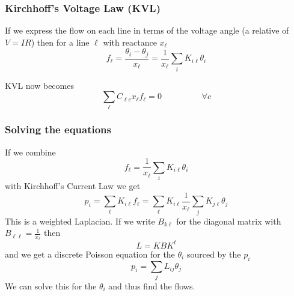 \documentclass[10pt,dvipsnames]{beamer}
\begin{document}
\begin{frame}
  \frametitle{Kirchhoff's Voltage Law (KVL)}

  If we express the flow on each line in terms of the voltage angle (a
  relative of $V = IR$) then for a line $\ell$ with reactance $x_\ell$
  \begin{equation*}
    f_\ell = \frac{\theta_i - \theta_j}{x_\ell} = \frac{1}{x_\ell}\sum_{i} K_{i\ell} \theta_i
  \end{equation*}

  KVL now becomes
  \begin{equation*}
    \sum_\ell C_{\ell c} x_\ell f_\ell = 0 \hspace{2cm} \forall c
  \end{equation*}

\end{frame}



\begin{frame}
  \frametitle{Solving the equations}

  If we combine
    \begin{equation*}
    f_\ell  = \frac{1}{x_\ell}\sum_{i} K_{i\ell} \theta_i
  \end{equation*}
    with Kirchhoff's Current Law we get
    \begin{equation*}
    p_i = \sum_{\ell} K_{i\ell}f_\ell =   \sum_{\ell} K_{i\ell} \frac{1}{x_\ell}\sum_{j} K_{j\ell} \theta_j
    \end{equation*}
    This is a \alert{weighted Laplacian}. If we write $B_{k\ell}$ for the diagonal matrix with $B_{\ell\ell} = \frac{1}{x_\ell}$ then
    \begin{equation*}
      L = KBK^t
    \end{equation*}
    and we get a \alert{discrete Poisson equation} for the $\theta_i$ sourced by the $p_i$
    \begin{equation*}
      p_i = \sum_{j} L_{ij} \theta_j
    \end{equation*}
    We can solve this for the $\theta_i$ and thus find the flows.

\end{frame}
\end{document}
